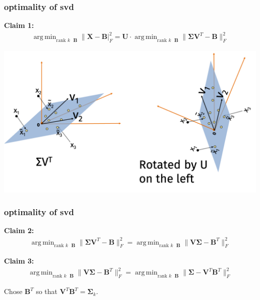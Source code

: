 \documentclass[compress]{beamer}
\newcommand{\bs}[1]{\boldsymbol{#1}}
\newcommand{\bv}[1]{\mathbf{#1}}
\DeclareMathOperator*{\argmin}{arg\,min}
\begin{document}
\begin{frame}[t]
	\frametitle{optimality of svd}
	\textbf{Claim 1:}
	\begin{align*}
		\argmin_{\text{rank $k$ }\bv{B}}  \|\bv{X} - \bv{B}|_F^2 = \bv{U}\cdot \argmin_{\text{rank $k$ }\bv{B}}   \|\bs{\Sigma}\bv{V}^T -  \bv{B}\|_F^2
	\end{align*}

		\begin{center}
	\includegraphics[width=.8\textwidth]{rotation_arg.png}
\end{center} 
\end{frame}

\begin{frame}[t]
	\frametitle{optimality of svd}	
	\textbf{Claim 2:}
	\begin{align*}
		\argmin_{\text{rank $k$ }\bv{B}}  \|\bs{\Sigma}\bv{V}^T -  \bv{B}\|_F^2 = \argmin_{\text{rank $k$ }\bv{B}}  \|\bv{V}\bs{\Sigma} -  \bv{B}^T\|_F^2
	\end{align*}
	
	\textbf{Claim 3:}
	\begin{align*}
		\argmin_{\text{rank $k$ }\bv{B}}  \|\bv{V}\bs{\Sigma} -  \bv{B}^T\|_F^2 = \argmin_{\text{rank $k$ }\bv{B}}  \|\bs{\Sigma} -  \bv{V}^T\bv{B}^T\|_F^2 
	\end{align*}

Chose $\bv{B}^T$ so that $\bv{V}^T\bv{B}^T = \bs{\Sigma}_k$.
\end{frame}
\end{document}
